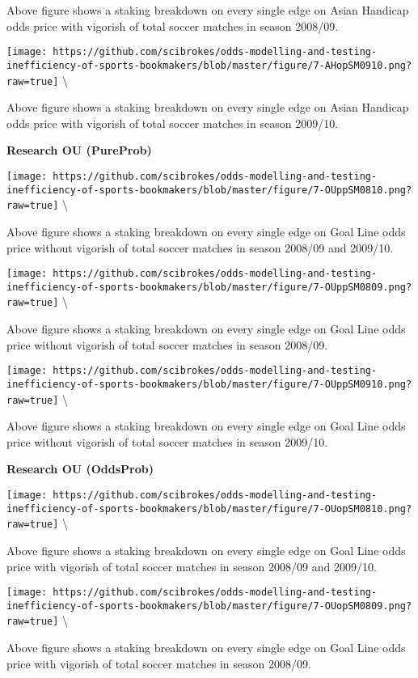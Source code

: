 \documentclass[article]{jss}
\begin{document}
Above figure shows a staking breakdown on every single edge on Asian
Handicap odds price with vigorish of total soccer matches in season
2008/09.

\texttt{[image: https://github.com/scibrokes/odds-modelling-and-testing-inefficiency-of-sports-bookmakers/blob/master/figure/7-AHopSM0910.png?raw=true]}
\textbackslash{}

Above figure shows a staking breakdown on every single edge on Asian
Handicap odds price with vigorish of total soccer matches in season
2009/10. \bigbreak

\textbf{Research OU (PureProb)} \bigbreak

\texttt{[image: https://github.com/scibrokes/odds-modelling-and-testing-inefficiency-of-sports-bookmakers/blob/master/figure/7-OUppSM0810.png?raw=true]}
\textbackslash{}

Above figure shows a staking breakdown on every single edge on Goal Line
odds price without vigorish of total soccer matches in season 2008/09
and 2009/10.

\texttt{[image: https://github.com/scibrokes/odds-modelling-and-testing-inefficiency-of-sports-bookmakers/blob/master/figure/7-OUppSM0809.png?raw=true]}
\textbackslash{}

Above figure shows a staking breakdown on every single edge on Goal Line
odds price without vigorish of total soccer matches in season 2008/09.

\texttt{[image: https://github.com/scibrokes/odds-modelling-and-testing-inefficiency-of-sports-bookmakers/blob/master/figure/7-OUppSM0910.png?raw=true]}
\textbackslash{}

Above figure shows a staking breakdown on every single edge on Goal Line
odds price without vigorish of total soccer matches in season 2009/10.
\bigbreak

\textbf{Research OU (OddsProb)} \bigbreak

\texttt{[image: https://github.com/scibrokes/odds-modelling-and-testing-inefficiency-of-sports-bookmakers/blob/master/figure/7-OUopSM0810.png?raw=true]}
\textbackslash{}

Above figure shows a staking breakdown on every single edge on Goal Line
odds price with vigorish of total soccer matches in season 2008/09 and
2009/10.

\texttt{[image: https://github.com/scibrokes/odds-modelling-and-testing-inefficiency-of-sports-bookmakers/blob/master/figure/7-OUopSM0809.png?raw=true]}
\textbackslash{}

Above figure shows a staking breakdown on every single edge on Goal Line
odds price with vigorish of total soccer matches in season 2008/09.
\end{document}

